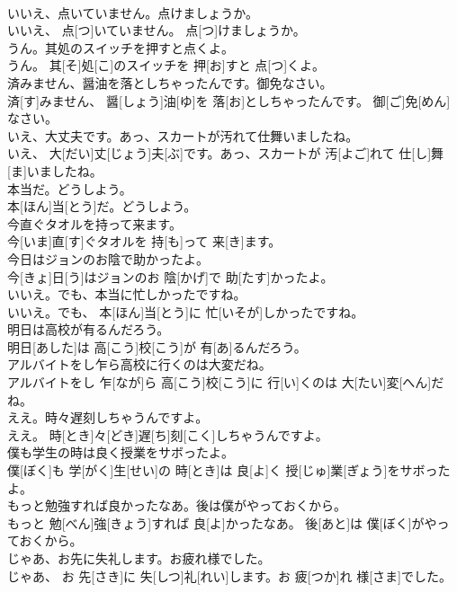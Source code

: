 \documentclass[8pt]{extreport}
\begin{document}
\begin{CJK}{UTF8}{min}
\\	いいえ、点いていません。点けましょうか。	
\\	いいえ、 点[つ]いていません。 点[つ]けましょうか。
\\	うん。其処のスイッチを押すと点くよ。	
\\	うん。 其[そ]処[こ]のスイッチを 押[お]すと 点[つ]くよ。
\\	済みません、醤油を落としちゃったんです。御免なさい。	
\\	済[す]みません、 醤[しょう]油[ゆ]を 落[お]としちゃったんです。 御[ご]免[めん]なさい。
\\	いえ、大丈夫です。あっ、スカートが汚れて仕舞いましたね。	
\\	いえ、 大[だい]丈[じょう]夫[ぶ]です。あっ、スカートが 汚[よご]れて 仕[し]舞[ま]いましたね。
\\	本当だ。どうしよう。	
\\	本[ほん]当[とう]だ。どうしよう。
\\	今直ぐタオルを持って来ます。	
\\	今[いま]直[す]ぐタオルを 持[も]って 来[き]ます。
\\	今日はジョンのお陰で助かったよ。	
\\	今[きょ]日[う]はジョンのお 陰[かげ]で 助[たす]かったよ。
\\	いいえ。でも、本当に忙しかったですね。	
\\	いいえ。でも、 本[ほん]当[とう]に 忙[いそが]しかったですね。
\\	明日は高校が有るんだろう。	
\\	明日[あした]は 高[こう]校[こう]が 有[あ]るんだろう。
\\	アルバイトをし乍ら高校に行くのは大変だね。	
\\	アルバイトをし 乍[なが]ら 高[こう]校[こう]に 行[い]くのは 大[たい]変[へん]だね。
\\	ええ。時々遅刻しちゃうんですよ。	
\\	ええ。 時[とき]々[どき]遅[ち]刻[こく]しちゃうんですよ。
\\	僕も学生の時は良く授業をサボったよ。	
\\	僕[ぼく]も 学[がく]生[せい]の 時[とき]は 良[よ]く 授[じゅ]業[ぎょう]をサボったよ。
\\	もっと勉強すれば良かったなあ。後は僕がやっておくから。	
\\	もっと 勉[べん]強[きょう]すれば 良[よ]かったなあ。 後[あと]は 僕[ぼく]がやっておくから。
\\	じゃあ、お先に失礼します。お疲れ様でした。	
\\	じゃあ、 お 先[さき]に 失[しつ]礼[れい]します。お 疲[つか]れ 様[さま]でした。

\end{CJK}
\end{document}
